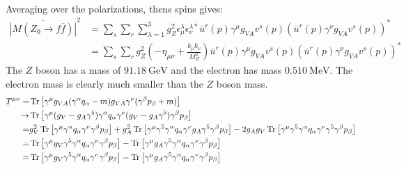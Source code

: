 \documentclass[12pt,a4]{article}
\begin{document}
\begin{enumerate}
\begin{enumerate}
\begin{align*}
        \end{align*}
        Averaging over the polarizations, thens spins gives:
        \begin{align*}
          \overline{|M(Z_0 \to f \bar{f})|}^2 
                                   &= \sum_{s}\sum_{r}\sum_{\lambda = 1}^{3} g_Z^2 \epsilon_\mu^\lambda \epsilon_\nu^{\lambda *} \bar{u}^r(p) \gamma^\mu g_{V A} v^s(p) ( \bar{u}^r(p) \gamma^\nu g_{V A} v^s(p))^*\\
                                   &= \sum_{s}\sum_{r}g_Z^2 \left(- \eta_{\mu \nu} + \frac{k_\mu k_\nu}{M_Z^2}\right) \bar{u}^r(p) \gamma^\mu g_{V A} v^s(p) ( \bar{u}^r(p) \gamma^\nu g_{V A} v^s(p))^*
        \end{align*}
        The $Z$ boson has a mass of $\SI{91.18}{\giga \eV}$ and the electron has mass $\SI{0.510}{\mega \eV}$. 
        The electron mass is clearly much smaller than the $Z$ boson mass.
        \begin{align*}
          T^{\mu\nu}  =& \Tr\left[\gamma^\mu g_{VA} (\gamma^\alpha q_\alpha - m) g_{VA} \gamma^\nu (\gamma^\beta p_\beta + m) \right]\\
                   \to & \Tr\left[\gamma^\mu (g_V - g_A \gamma^5) \gamma^\alpha q_\alpha \gamma^\nu (g_V - g_A \gamma^5) \gamma^\beta p_\beta \right]\\
                      =& g_V^2 \Tr\left[\gamma^\mu  \gamma^\alpha q_\alpha \gamma^\nu \gamma^\beta p_\beta \right] + g_A^2 \Tr\left[\gamma^\mu \gamma^5 \gamma^\alpha q_\alpha \gamma^\nu g_A \gamma^5 \gamma^\beta p_\beta \right] -  2 g_A g_V\Tr\left[\gamma^\mu \gamma^5 \gamma^\alpha q_\alpha \gamma^\nu  \gamma^5 \gamma^\beta p_\beta \right]\\
                      =& \Tr\left[\gamma^\mu g_V \gamma^5 \gamma^\alpha q_\alpha \gamma^\nu \gamma^\beta p_\beta \right] - \Tr\left[\gamma^\mu g_A \gamma^5 \gamma^\alpha q_\alpha \gamma^\nu \gamma^\beta p_\beta \right]\\
                      =& \Tr\left[\gamma^\mu g_V \gamma^5 \gamma^\alpha q_\alpha \gamma^\nu \gamma^\beta p_\beta \right] - \Tr\left[\gamma^\mu g_A \gamma^5 \gamma^\alpha q_\alpha \gamma^\nu \gamma^\beta p_\beta \right]\\
        \end{align*}
    \end{enumerate}
\end{enumerate}
\end{document}
